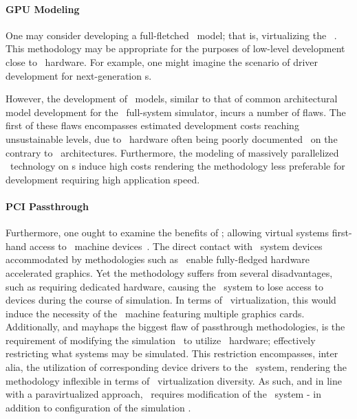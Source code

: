 \paragraph{GPU Modeling}
\label{par:backgroundandrelatedwork_graphicsvirtualization_gpumodeling}
One may consider developing a full-fletched \dvttermgpu\ model; that is, virtualizing the \dvttermgpu\ \dvttermisa .
This methodology may be appropriate for the purposes of low-level development close to \dvttermgpu\ hardware.
For example, one might imagine the scenario of driver development for next-generation \dvttermgpu s.

However, the development of \dvttermgpu\ models, similar to that of common architectural model development for the \dvttermsimics\ full-system simulator, incurs a number of flaws.
The first of these flaws encompasses estimated development costs reaching unsustainable levels, due to \dvttermgpu\ hardware often being poorly documented~ on the contrary to \dvttermcpu\ architectures.
Furthermore, the modeling of massively parallelized \dvttermgpu\ technology on \dvttermcpu s induce high costs rendering the methodology less preferable for development requiring high application speed.

\paragraph{PCI Passthrough}
\label{par:backgroundandrelatedwork_graphicsvirtualization_pcipassthrough}
Furthermore, one ought to examine the benefits of \dvttermpcipassthrough ; allowing virtual systems first-hand access to \dvttermhost\ machine devices~.
The direct contact with \dvttermhost\ system devices accommodated by methodologies such as \dvttermpcipassthrough\ enable fully-fledged hardware accelerated graphics.
Yet the methodology suffers from several disadvantages, such as requiring dedicated hardware, causing the \dvttermhost\ system to lose access to devices during the course of simulation.
In terms of \dvttermgpu\ virtualization, this would induce the necessity of the \dvttermhost\ machine featuring multiple graphics cards.
Additionally, and mayhaps the biggest flaw of passthrough methodologies, is the requirement of modifying the simulation \dvttermtarget\ to utilize \dvttermhost\ hardware; effectively restricting what systems may be simulated.
This restriction encompasses, inter alia, the utilization of corresponding device drivers to the \dvttermhost\ system, rendering the methodology inflexible in terms of \dvttermgpu\ virtualization diversity.
As such, and in line with a paravirtualized approach, \dvttermpcipassthrough\ requires modification of the \dvttermtarget\ system - in addition to configuration of the simulation \dvttermhost .

